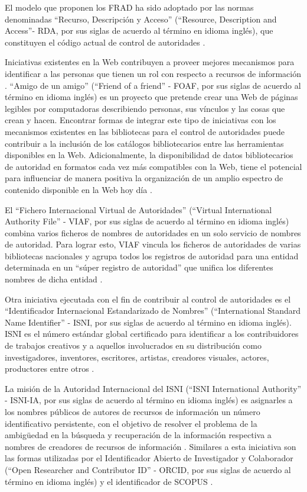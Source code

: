 El modelo que proponen los FRAD ha sido adoptado por las normas denominadas ``Recurso, Descripción y Acceso'' (``Resource, Description and Access''- RDA, por sus siglas de acuerdo al término en idioma inglés), que constituyen el código actual de control de autoridades \citep{Sandberg2016}.

Iniciativas existentes en la Web contribuyen a proveer mejores mecanismos para identificar a las personas que tienen un rol con respecto a recursos de información \citep{Harper2007}. ``Amigo de un amigo'' (``Friend of a friend'' - FOAF, por sus siglas de acuerdo al término en idioma inglés) es un proyecto que pretende crear una Web de páginas legibles por computadoras describiendo personas, sus vínculos y las cosas que crean y hacen. Encontrar formas de integrar este tipo de iniciativas con los mecanismos existentes en las bibliotecas para el control de autoridades puede contribuir a la inclusión de los catálogos bibliotecarios entre las herramientas disponibles en la Web. Adicionalmente, la disponibilidad de datos bibliotecarios de autoridad en formatos cada vez más compatibles con la Web, tiene el potencial para influenciar de manera positiva la organización de un amplio espectro de contenido disponible en la Web hoy día \citep{Harper2007}.

El ``Fichero Internacional Virtual de Autoridades'' (``Virtual International Authority File'' - VIAF, por sus siglas de acuerdo al término en idioma inglés) combina varios ficheros de nombres de autoridades en un solo servicio de nombres de autoridad. Para lograr esto, VIAF vincula los ficheros de autoridades de varias bibliotecas nacionales y agrupa todos los registros de autoridad para una entidad determinada en un ``súper registro de autoridad'' que unifica los diferentes nombres de dicha entidad \citep{OCLCOnlineComputerLibraryCenterInc.2014}.

Otra iniciativa ejecutada con el fin de contribuir al control de autoridades es el ``Identificador Internacional Estandarizado de Nombres'' (``International Standard Name Identifier'' - ISNI, por sus siglas de acuerdo al término en idioma inglés). ISNI es el número estándar global certificado para identificar a los contribuidores de trabajos creativos y a aquellos involucrados en su distribución como investigadores, inventores, escritores, artistas, creadores visuales, actores, productores entre otros \citep{ISNIInternationalStandardNameIdentifier2017}.

La misión de la Autoridad Internacional del ISNI (``ISNI International Authority'' - ISNI-IA, por sus siglas de acuerdo al término en idioma inglés) es asignarles a los nombres públicos de autores de recursos de información un número identificativo persistente, con el objetivo de resolver el problema de la ambigüedad en la búsqueda y recuperación de la información respectiva a nombres de creadores de recursos de información \citep{ISNIInternationalStandardNameIdentifier2017}. Similares a esta iniciativa son las formas utilizadas por el Identificador Abierto de Investigador y Colaborador (``Open Researcher and Contributor ID'' - ORCID, por sus siglas de acuerdo al término en idioma inglés) \citep{ORCID2017} y el identificador de SCOPUS \citep{Elsevier2016}.

